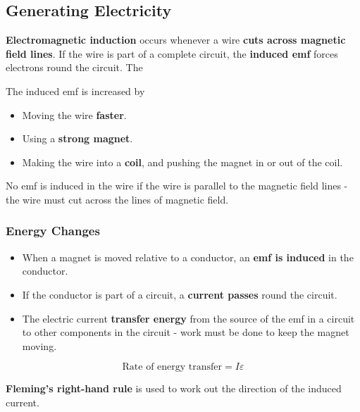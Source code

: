 \subsection{Generating Electricity}

\textbf{Electromagnetic induction} occurs whenever a wire \textbf{cuts across magnetic field lines}. If the wire is part of a complete circuit, the \textbf{induced emf} forces electrons round the circuit. The

The induced emf is increased by
\begin{itemize}
    \item Moving the wire \textbf{faster}.
    \item Using a \textbf{strong magnet}.
    \item Making the wire into a \textbf{coil}, and pushing the magnet in or out of the coil.
\end{itemize}

No emf is induced in the wire if the wire is parallel to the magnetic field lines - the wire must cut across the lines of magnetic field.

\subsubsection*{Energy Changes}

\begin{itemize}
    \item When a magnet is moved relative to a conductor, an \textbf{emf is induced} in the conductor.
    \item If the conductor is part of a circuit, a \textbf{current passes} round the circuit.
    \item The electric current \textbf{transfer energy} from the source of the emf in a circuit to other components in the circuit - work must be done to keep the magnet moving.
\end{itemize}
$$\text{Rate of energy transfer}=I\varepsilon$$

\textbf{Fleming's right-hand rule} is used to work out the direction of the induced current.
